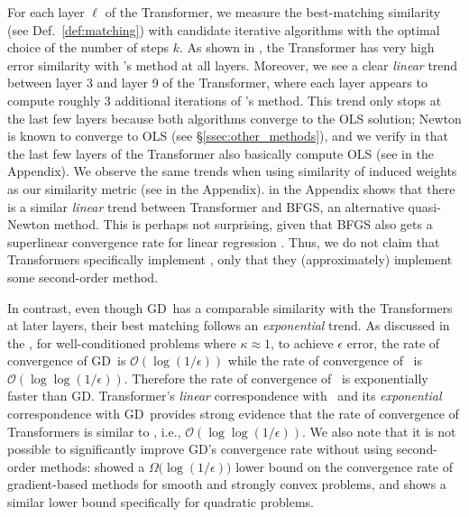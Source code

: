 For each layer $\ell$ of the Transformer,
we measure the best-matching similarity (see Def.~\ref{def:matching}) with candidate iterative algorithms with the optimal choice of the number of steps $k$.
As shown in , the Transformer has very high error similarity with \newton's method at all layers.
Moreover, we see a clear \emph{linear} trend between layer 3 and layer 9 of the Transformer, where each layer appears to compute roughly 3 additional iterations of \newton's method.
This trend only stops at the last few layers because both algorithms converge to the OLS solution;
Newton is known to converge to OLS (see \S\ref{ssec:other_methods}), and we verify in  that the last few layers of the Transformer also basically compute OLS (see  in the Appendix). 
We observe the same trends when using similarity of induced weights as our similarity metric (see  in the Appendix). in the Appendix shows that there is a similar \textit{linear} trend between Transformer and BFGS, an alternative quasi-Newton method. This is perhaps not surprising, given that BFGS also gets a superlinear convergence rate for linear regression \cite{nocedal1999numerical}.
Thus, we do not claim that Transformers specifically implement \newton, only that they (approximately) implement some second-order method.

In contrast, even though GD\ has a comparable similarity with the Transformers at later layers, their best matching follows an \textit{exponential} trend. As discussed in the , for well-conditioned problems where  $\kappa \approx 1$, to achieve $\epsilon$ error, the rate of convergence of GD\ is $\mathcal{O}(\log (1/\epsilon))$ while the rate of convergence of \newton\ is $\mathcal{O}(\log \log (1/\epsilon))$. Therefore the rate of convergence of \newton\ is exponentially faster than GD.  Transformer's \textit{linear} correspondence with \newton\ and its \textit{exponential} correspondence with GD\ provides strong evidence   that the rate of convergence of Transformers is similar to \newton, i.e., $\mathcal O(\log \log (1/\epsilon))$. We also note that it is not possible to significantly improve GD's convergence rate without using second-order methods: \citet{nemirovskii1983problem} showed a $ \Omega\big( \log(1/\epsilon) \big)$  lower bound on the convergence rate of gradient-based methods for smooth and strongly convex problems, and \cite{Arjevani2016OnLower} shows a similar lower bound specifically for quadratic problems. 


